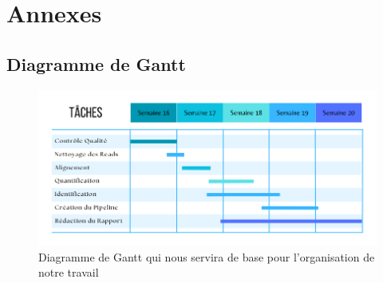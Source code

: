 \chapter*{Annexes}

\section*{Diagramme de Gantt}

\begin{figure}[ht]
    \centering
    \includegraphics[width=1\textwidth]{img/gantt.png}
    \caption{Diagramme de Gantt qui nous servira de base pour l'organisation de notre travail}
    \label{fig:gantt}
\end{figure}